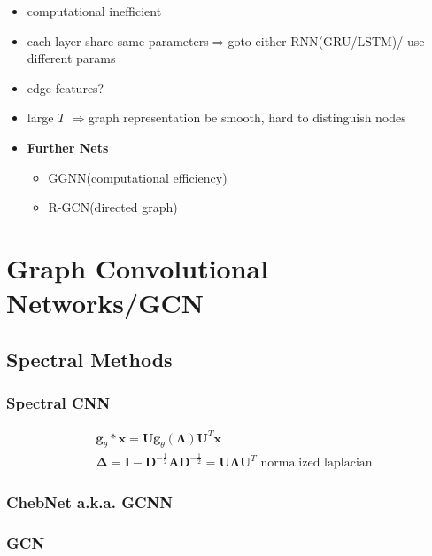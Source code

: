 \documentclass{article}
\newcommand{\tRarr}{$\Rightarrow$}
\newcommand{\trarr}{$\Rightarrow$}
\newcommand{\bs}[1]{\boldsymbol{#1}}
\newcommand{\bt}[1]{\textbf{#1}}
\begin{document}
\begin{itemize}
    \item computational inefficient
    \item each layer share same parameters\tRarr goto either RNN(GRU/LSTM)/ use different params
    \item edge features?
    \item large $T$ \trarr graph representation be smooth, hard to distinguish nodes
    \item \bt{Further Nets} 
    \begin{itemize}
        \item GGNN(computational efficiency)
        \item R-GCN(directed graph)
    \end{itemize}
\end{itemize}

\section{Graph Convolutional Networks/GCN}

\subsection{Spectral Methods}

\subsubsection{Spectral CNN}

\begin{align}
    &\bs g_\theta * \bs x=\bs U \bs g_\theta(\bs \Lambda) \bs U^T \bs x\\
    &\bs \Delta=\bs I - \bs D^{-\frac{1}{2}} \bs A \bs D^{-\frac{1}{2}}=\bs U \bs \Lambda \bs U^T\text{ normalized laplacian}
\end{align}

\subsubsection{ChebNet a.k.a. GCNN}
\subsubsection{GCN}
\end{document}
